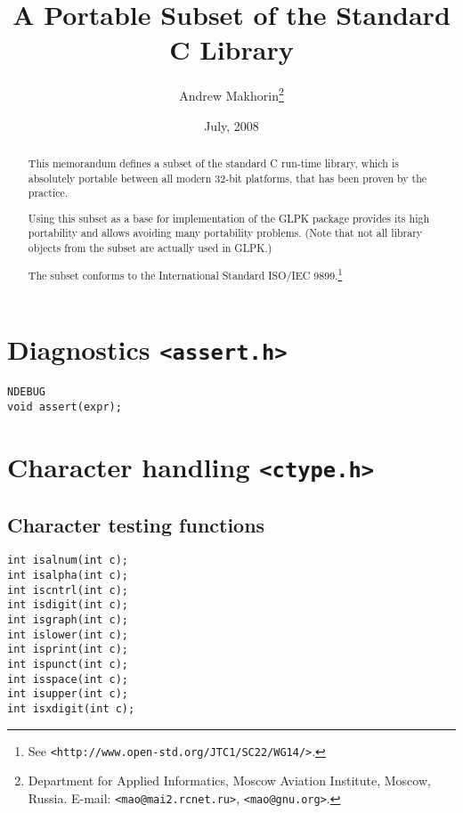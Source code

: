 \documentclass[a4paper,11pt,draft]{article}
\begin{document}
\title{A Portable Subset of the Standard C Library}

\author{Andrew Makhorin\footnote{Department for Applied Informatics,
Moscow Aviation Institute, Moscow, Russia. E-mail:
{\tt <mao@mai2.rcnet.ru>}, {\tt <mao@gnu.org>}.}}

\date{July, 2008}

\maketitle

\begin{abstract}
This memorandum defines a subset of the standard C run-time library,
which is absolutely portable between all modern 32-bit platforms, that
has been proven by the practice.

Using this subset as a base for implementation of the GLPK package
provides its high portability and allows avoiding many portability
problems. (Note that not all library objects from the subset are
actually used in GLPK.)

The subset conforms to the International Standard ISO/IEC
9899.\footnote{See {\tt <http://www.open-std.org/JTC1/SC22/WG14/>}.}
\end{abstract}

\section*{Diagnostics {\tt <assert.h>}}

\begin{verbatim}
NDEBUG
void assert(expr);
\end{verbatim}

\section*{Character handling {\tt <ctype.h>}}

\subsection*{Character testing functions}

\begin{verbatim}
int isalnum(int c);
int isalpha(int c);
int iscntrl(int c);
int isdigit(int c);
int isgraph(int c);
int islower(int c);
int isprint(int c);
int ispunct(int c);
int isspace(int c);
int isupper(int c);
int isxdigit(int c);
\end{verbatim}
\end{document}
